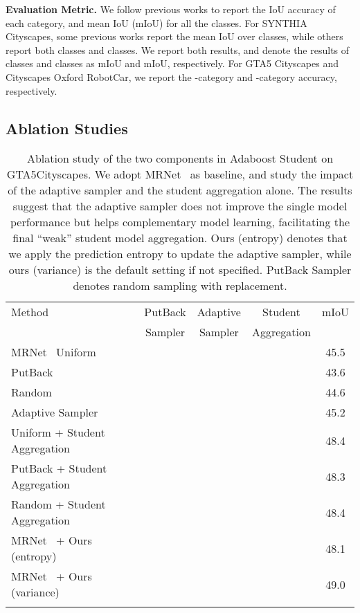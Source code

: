 \documentclass[journal]{IEEEtran}
\begin{document}
\noindent\textbf{Evaluation Metric.} We follow previous works to report the IoU accuracy of each category, and mean IoU (mIoU) for all the classes. For SYNTHIA  Cityscapes, some previous works report the mean IoU over  classes, while others report both  classes and  classes. We report both results, and denote the results of  classes and  classes as mIoU and mIoU, respectively. For GTA5  Cityscapes and Cityscapes  Oxford RobotCar, we report the -category and -category accuracy, respectively. 

\subsection{Ablation Studies}


\begin{table}[tbp]
\caption{Ablation study of the two components in Adaboost Student on GTA5Cityscapes. We adopt MRNet~\cite{zheng2019unsupervised} as baseline, and study the impact of the adaptive sampler and the student aggregation alone. The results suggest that the adaptive sampler does not improve the single model performance but helps complementary model learning, facilitating the final ``weak'' student model aggregation. Ours (entropy) denotes that we apply the prediction entropy to update the adaptive sampler, while ours (variance) is the default setting if not specified. PutBack Sampler denotes random sampling with replacement.
} \label{table:ablation}
\vspace{-.2in}
\begin{center}
\resizebox{\linewidth}{!}
{
\setlength{\tabcolsep}{3pt}
\begin{tabular}{l|c|c|c|c}
\shline
Method  & PutBack  &  Adaptive & Student & mIoU \\
  & Sampler & Sampler & Aggregation & \\
\hline
MRNet~\cite{zheng2019unsupervised}  Uniform & & & & 45.5 \\
 PutBack  &  &  & & 43.6 \\
 Random & & & & 44.6 \\
 Adaptive Sampler &  &  & & 45.2 \\
 Uniform + Student Aggregation &  & &  & 48.4 \\
 PutBack + Student Aggregation &  &  &  & 48.3 \\
 Random + Student Aggregation & & &  & 48.4 \\
MRNet~\cite{zheng2019unsupervised} + Ours (entropy)  & &  &  &  48.1 \\
MRNet~\cite{zheng2019unsupervised} + Ours (variance)  & &  &  & 49.0 \\
\shline
\end{tabular}}
\end{center}
\end{table}
\end{document}
